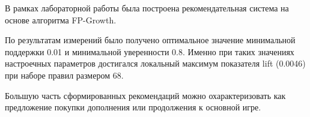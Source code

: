 
В рамках лабораторной работы была построена рекомендательная система на основе алгоритма FP-Growth.

По результатам измерений было получено оптимальное значение минимальной поддержки 0.01 и минимальной уверенности 0.8. Именно при таких значениях настроечных параметров достигался локальный максимум показателя lift (0.0046) при наборе правил размером 68.

Большую часть сформированных рекомендаций можно охарактеризовать как предложение покупки дополнения или продолжения к основной игре.
